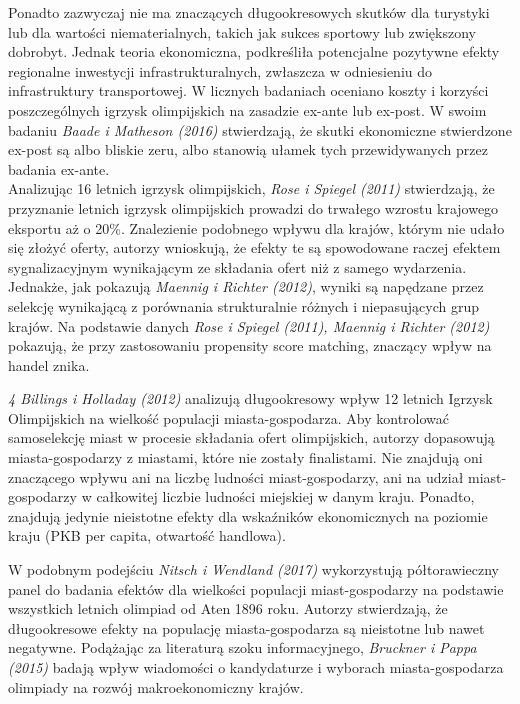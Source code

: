 \documentclass[12pt]{article}
\begin{document}
Ponadto zazwyczaj nie ma znaczących długookresowych skutków dla turystyki lub dla wartości niematerialnych, takich jak sukces sportowy lub zwiększony dobrobyt. Jednak teoria ekonomiczna, podkreśliła potencjalne pozytywne efekty regionalne inwestycji infrastrukturalnych, zwłaszcza w odniesieniu do infrastruktury transportowej. W licznych badaniach oceniano koszty i korzyści poszczególnych igrzysk olimpijskich na zasadzie ex-ante lub ex-post. W swoim badaniu \textit{Baade i Matheson (2016)} stwierdzają, że skutki ekonomiczne stwierdzone ex-post są albo bliskie zeru, albo stanowią ułamek tych przewidywanych przez badania ex-ante.\\

Analizując 16 letnich igrzysk olimpijskich, \textit{Rose i Spiegel (2011)} stwierdzają, że przyznanie letnich igrzysk olimpijskich prowadzi do trwałego wzrostu krajowego eksportu aż o 20\%. Znalezienie podobnego wpływu dla krajów, którym nie udało się złożyć oferty, autorzy wnioskują, że efekty te są spowodowane raczej efektem sygnalizacyjnym wynikającym ze składania ofert niż z samego wydarzenia. Jednakże, jak pokazują \textit{Maennig i Richter (2012)}, wyniki są napędzane przez selekcję wynikającą z porównania strukturalnie różnych i niepasujących grup krajów. Na podstawie danych \textit{Rose i Spiegel (2011), Maennig i Richter (2012)} pokazują, że przy zastosowaniu propensity score matching, znaczący wpływ na handel znika. 

\textit{4 Billings i Holladay (2012)} analizują długookresowy wpływ 12 letnich Igrzysk Olimpijskich na wielkość populacji miasta-gospodarza. Aby kontrolować samoselekcję miast w procesie składania ofert olimpijskich, autorzy dopasowują miasta-gospodarzy z miastami, które nie zostały finalistami. Nie znajdują oni znaczącego wpływu ani na liczbę ludności miast-gospodarzy, ani na udział miast-gospodarzy w całkowitej liczbie ludności miejskiej w danym kraju. Ponadto, znajdują jedynie nieistotne efekty dla wskaźników ekonomicznych na poziomie kraju (PKB per capita, otwartość handlowa). 

W podobnym podejściu \textit{Nitsch i Wendland (2017)} wykorzystują półtorawieczny panel do badania efektów dla wielkości populacji miast-gospodarzy na podstawie wszystkich letnich olimpiad od Aten 1896 roku. Autorzy stwierdzają, że długookresowe efekty na populację miasta-gospodarza są nieistotne lub nawet negatywne. Podążając za literaturą szoku informacyjnego, \textit{Bruckner i Pappa (2015)} badają wpływ wiadomości o kandydaturze i wyborach miasta-gospodarza olimpiady na rozwój makroekonomiczny krajów.\\
\end{document}
